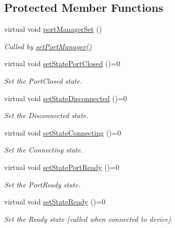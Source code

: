 \subsection*{Protected Member Functions}
\begin{DoxyCompactItemize}
\item 
virtual void \hyperlink{classmdt_abstract_port_setup_dialog_a3393de371465c1e278711b5b2fd8d2c2}{portManagerSet} ()
\begin{DoxyCompactList}\small\item\em Called by \hyperlink{classmdt_abstract_port_setup_dialog_a016ab988e47c7702a9400985eb95fbc5}{setPortManager()} \end{DoxyCompactList}\item 
virtual void \hyperlink{classmdt_abstract_port_setup_dialog_a8df0ba3ef89cf29c9bc16c01e1aafc25}{setStatePortClosed} ()=0
\begin{DoxyCompactList}\small\item\em Set the PortClosed state. \end{DoxyCompactList}\item 
virtual void \hyperlink{classmdt_abstract_port_setup_dialog_a6943bd9ed9fd9678c256b54c44d7227c}{setStateDisconnected} ()=0
\begin{DoxyCompactList}\small\item\em Set the Disconnected state. \end{DoxyCompactList}\item 
virtual void \hyperlink{classmdt_abstract_port_setup_dialog_af0b938b1b8c3567c03feb02ba71307d4}{setStateConnecting} ()=0
\begin{DoxyCompactList}\small\item\em Set the Connecting state. \end{DoxyCompactList}\item 
virtual void \hyperlink{classmdt_abstract_port_setup_dialog_a7a25a1b0377f60dad49856e7d04a1558}{setStatePortReady} ()=0
\begin{DoxyCompactList}\small\item\em Set the PortReady state. \end{DoxyCompactList}\item 
virtual void \hyperlink{classmdt_abstract_port_setup_dialog_aac277958ac97ad7ad94135e0d152b732}{setStateReady} ()=0
\begin{DoxyCompactList}\small\item\em Set the Ready state (called when connected to device) \end{DoxyCompactList}\item 

\end{DoxyCompactItemize}
